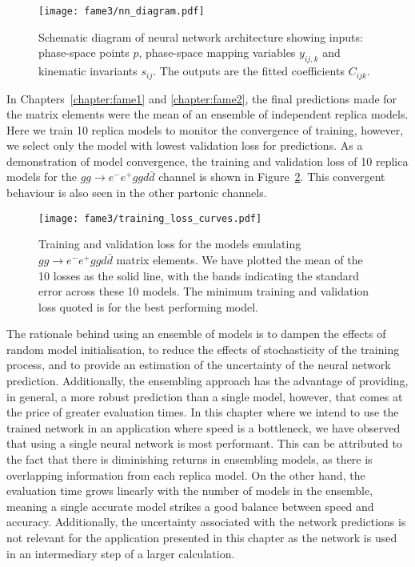 \documentclass[main.tex]{subfiles}
\begin{document}
\begin{figure}
    \texttt{[image: fame3/nn\_diagram.pdf]}
    \caption{Schematic diagram of neural network architecture
     showing inputs: phase-space points $p$, phase-space mapping
     variables $y_{ij,k}$ and kinematic invariants $s_{ij}$.
     The outputs are the fitted coefficients $C_{ijk}$.}
    \label{fig:pp_nn}
\end{figure}

In Chapters~\ref{chapter:fame1} and \ref{chapter:fame2}, the final
predictions made for the matrix elements were the mean of an
ensemble of independent replica models.
Here we train 10 replica models to monitor the convergence of training,
however, we select only the model with lowest validation loss for
predictions. As a demonstration of model convergence, the training
and validation loss of 10 replica models for the
$gg \rightarrow e^{-}e^{+}ggd\bar{d}$ channel is shown in
Figure~\ref{fig:pp_loss_plot}. This convergent behaviour is
also seen in the other partonic channels.

\begin{figure}
    \texttt{[image: fame3/training\_loss\_curves.pdf]}
    \caption{Training and validation loss for the models emulating
    $gg \rightarrow e^{-}e^{+}ggd\bar{d}$ matrix elements. We have
    plotted the mean of the 10 losses as the solid line, with the bands
    indicating the standard error across these 10 models.
    The minimum training and validation loss quoted is for the best
    performing model.}
    \label{fig:pp_loss_plot}
\end{figure}

The rationale behind using an ensemble of models is to dampen the
effects of random model initialisation, to reduce the effects of
stochasticity of the training process, and to provide an estimation
of the uncertainty of the neural network prediction. Additionally, the ensembling
approach has the advantage of providing, in general, a more robust
prediction than a single model, however, that comes at the price
of greater evaluation times. In this chapter where we intend to use the
trained network in an application where speed is a bottleneck, we
have observed that using a single neural network is most performant.
This can be attributed to the fact that there is diminishing returns
in ensembling models, as there is overlapping information from each
replica model. On the other hand, the evaluation time grows linearly
with the number of models in the ensemble, meaning a single
accurate model strikes a good balance between speed and accuracy.
Additionally, the uncertainty associated with the network predictions
is not relevant for the application presented in this chapter as the
network is used in an intermediary step of a larger calculation.
\end{document}
